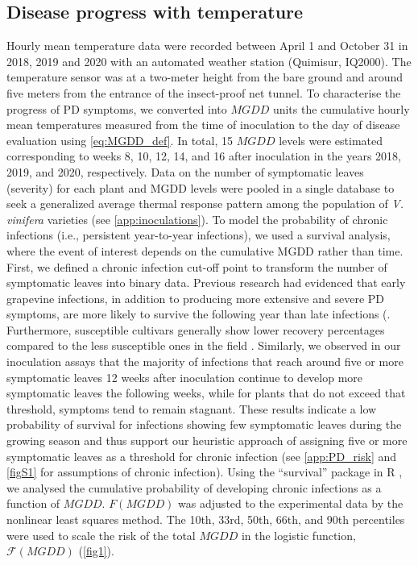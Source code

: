 \subsection{Disease progress with temperature}

Hourly mean temperature data were recorded between April 1 and October 31 in
2018, 2019 and 2020 with an automated weather station (Quimisur, IQ2000). The
temperature sensor was at a two-meter height from the bare ground and around
five meters from the entrance of the insect-proof net tunnel. To characterise
the progress of PD symptoms, we converted into $MGDD$ units the cumulative
hourly mean temperatures measured from the time of inoculation to the day of
disease evaluation using \cref{eq:MGDD_def}. In total, 15 $MGDD$ levels were
estimated corresponding to weeks 8, 10, 12, 14, and 16 after inoculation in the
years 2018, 2019, and 2020, respectively. Data on the number of symptomatic
leaves (severity) for each plant and MGDD levels were pooled in a single
database to seek a generalized average thermal response pattern among the
population of \textit{V. vinifera} varieties (see \cref{app:inoculations}). To
model the probability of chronic infections (i.e., persistent year-to-year
infections), we used a survival analysis, where the event of interest depends
on the cumulative MGDD rather than time. First, we defined a chronic infection
cut-off point to transform the number of symptomatic leaves into binary data.
Previous research had evidenced that early grapevine infections, in addition to
producing more extensive and severe PD symptoms, are more likely to survive the
following year than late infections (\cite{Feil2001, Feil2003, Lieth2011}.
Furthermore, susceptible cultivars generally show lower recovery percentages
compared to the less susceptible ones in the field
\cite{purcell1974spatial,purcell1981vector}. Similarly, we observed in our
inoculation assays that the majority of infections that reach around five or
more symptomatic leaves 12 weeks after inoculation continue to develop more
symptomatic leaves the following weeks, while for plants that do not exceed
that threshold, symptoms tend to remain stagnant. These results indicate a low
probability of survival for infections showing few symptomatic leaves during
the growing season and thus support our heuristic approach of assigning five or
more symptomatic leaves as a threshold for chronic infection (see
\cref{app:PD_risk} and \cref{figS1} for assumptions of chronic infection).
Using the ``survival'' package in R \cite{survival-package}, we analysed the
cumulative probability of developing chronic infections as a function of
$MGDD$. $F(MGDD)$ was adjusted to the experimental data by the nonlinear least
squares method. The 10th, 33rd, 50th, 66th, and 90th percentiles were used to
scale the risk of the total $MGDD$ in the logistic function,
$\mathcal{F}(MGDD)$ (\cref{fig1}).

